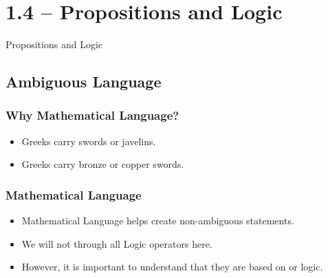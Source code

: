 \documentclass{beamer}
\begin{document}

\section{1.4 -- Propositions and Logic}

\begin{frame}
  \begin{center}
    Propositions and Logic
  \end{center}
\end{frame}

\subsection{Ambiguous Language}
\begin{frame}
  \frametitle{Why Mathematical Language?}

  \begin{itemize}
  \item Greeks carry swords or javelins.

    \bigskip

  \item Greeks carry bronze or copper swords.
  \end{itemize}
\end{frame}

\begin{frame}
  \frametitle{Mathematical Language}
  \begin{itemize}
  \item Mathematical Language helps create non-ambiguous statements.
    \bigskip

  \item We will not through all Logic operators here.
    \bigskip

  \item However, it is important to understand that they are based on
     or  logic.
  \end{itemize}
\end{frame}

\end{document}
